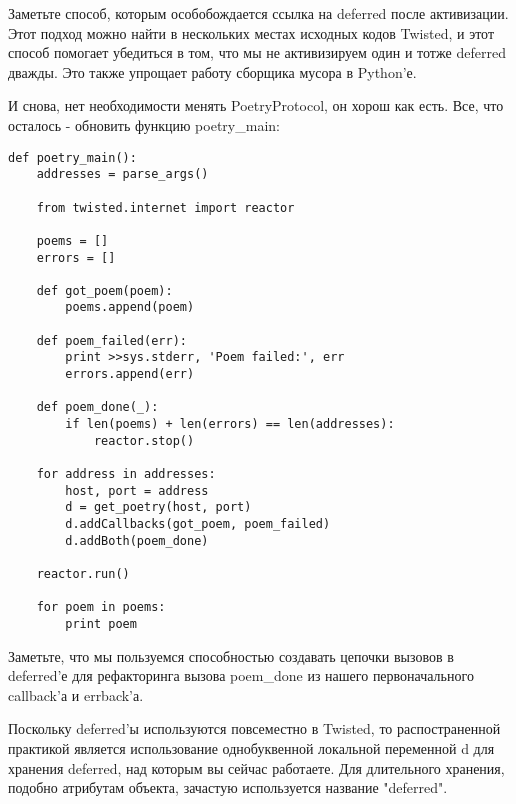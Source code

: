 Заметьте способ, которым особобождается ссылка на 
deferred после активизации. Этот подход можно найти 
в нескольких местах исходных кодов Twisted, и этот способ  
помогает убедиться в том, что мы не активизируем один и тотже 
deferred дважды. Это также упрощает работу сборщика мусора в Python'е.


И снова, нет необходимости менять PoetryProtocol, он хорош 
как есть. Все, что осталось - обновить функцию poetry\_main: 

 \begin{verbatim}
def poetry_main():
    addresses = parse_args()

    from twisted.internet import reactor

    poems = []
    errors = []

    def got_poem(poem):
        poems.append(poem)

    def poem_failed(err):
        print >>sys.stderr, 'Poem failed:', err
        errors.append(err)

    def poem_done(_):
        if len(poems) + len(errors) == len(addresses):
            reactor.stop()

    for address in addresses:
        host, port = address
        d = get_poetry(host, port)
        d.addCallbacks(got_poem, poem_failed)
        d.addBoth(poem_done)

    reactor.run()

    for poem in poems:
        print poem
\end{verbatim} 


Заметьте, что мы пользуемся способностью создавать цепочки 
вызовов в deferred'е для рефакторинга вызова poem\_done из 
нашего первоначального callback'а и errback'а.


Поскольку deferred'ы используются повсеместно в Twisted, 
то распостраненной практикой является использование 
однобуквенной локальной переменной d для хранения deferred, 
над которым вы сейчас работаете. Для длительного хранения, 
подобно атрибутам объекта, зачастую используется 
название "deferred".


